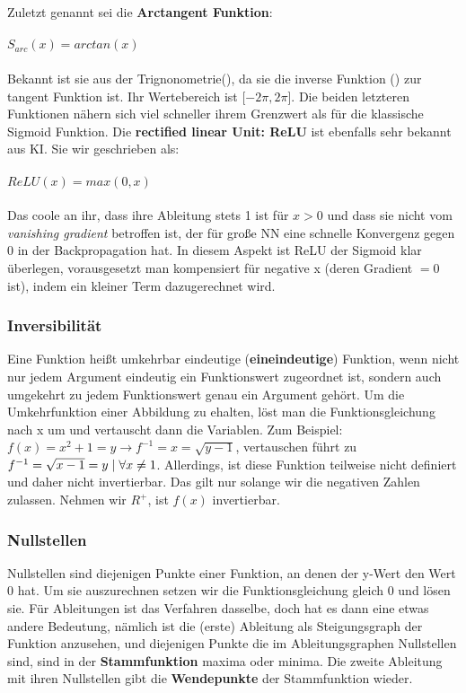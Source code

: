 \documentclass[letterpaper, titlepage]{article}
\begin{document}
\\ \\ 
Zuletzt genannt sei die \textbf{Arctangent Funktion}:
\\ \\
$S_{arc}(x)=arctan(x)$
\\ \\ 
Bekannt ist sie aus der Trignonometrie(), da sie die inverse Funktion () zur tangent Funktion ist. Ihr Wertebereich ist [$-2 \pi, 2 \pi$]. Die beiden letzteren Funktionen nähern sich viel schneller ihrem Grenzwert als für die klassische Sigmoid Funktion. Die \textbf{rectified linear Unit: ReLU} ist ebenfalls sehr bekannt aus KI. Sie wir geschrieben als: 
\\ \\
$ReLU(x)=max(0,x)$
\\ \\
Das coole an ihr, dass ihre Ableitung stets 1 ist für $x>0$ und dass sie nicht vom \textit{vanishing gradient} betroffen ist, der für große NN eine schnelle Konvergenz gegen 0 in der Backpropagation hat. In diesem Aspekt ist ReLU der Sigmoid klar überlegen, vorausgesetzt man kompensiert für negative x (deren Gradient $= 0$ ist), indem ein kleiner Term dazugerechnet wird.
\subsubsection{Inversibilität}\label{Inversibilität}
Eine Funktion heißt umkehrbar eindeutige (\textbf{eineindeutige}) Funktion, wenn nicht nur jedem Argument eindeutig ein Funktionswert zugeordnet ist, sondern auch umgekehrt zu jedem Funktionswert genau ein Argument gehört. Um die Umkehrfunktion einer Abbildung zu ehalten, löst man die Funktionsgleichung nach x um und vertauscht dann die Variablen. Zum Beispiel: $f(x)=x^2+1=y \rightarrow f^{-1}=x=\sqrt{y-1}$, vertauschen führt zu $f^{-1}=\sqrt{x-1}=y \hspace{0.1cm} | \hspace{0.1cm} \forall x \neq 1$. Allerdings, ist diese Funktion teilweise nicht definiert und daher nicht invertierbar. Das gilt nur solange wir die negativen Zahlen zulassen. Nehmen wir $\textit{R}^+$, ist $f(x)$ invertierbar.
\subsubsection{Nullstellen}
Nullstellen sind diejenigen Punkte einer Funktion, an denen der y-Wert den Wert 0 hat. Um sie auszurechnen setzen wir die Funktionsgleichung gleich 0 und lösen sie. Für Ableitungen ist das Verfahren dasselbe, doch hat es dann eine etwas andere Bedeutung, nämlich ist die (erste) Ableitung als Steigungsgraph der Funktion anzusehen, und diejenigen Punkte die im Ableitungsgraphen Nullstellen sind, sind in der \textbf{Stammfunktion} maxima oder minima. Die zweite Ableitung mit ihren Nullstellen gibt die \textbf{Wendepunkte} der Stammfunktion wieder. 
\end{document}
